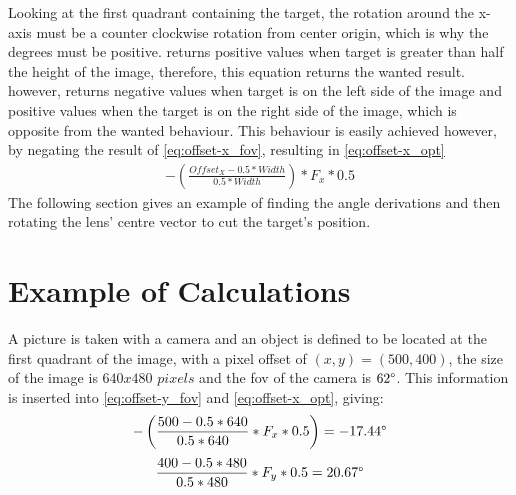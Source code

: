 Looking at the first quadrant containing the target, the rotation around the x-axis must be a counter clockwise rotation from center origin, which is why the degrees must be positive.  returns positive values when target is greater than half the height of the image, therefore, this equation returns the wanted result.  however, returns negative values when target is on the left side of the image and positive values when the target is on the right side of the image, which is opposite from the wanted behaviour. This behaviour is easily achieved however, by negating the result of \cref{eq:offset-x_fov}, resulting in \cref{eq:offset-x_opt}
\begin{align}
-\left(\frac{Offset_X - 0.5 * Width}{0.5 * Width}\right)*F_x*0.5
\label{eq:offset-x_opt}
\end{align}
The following section gives an example of finding the angle derivations and then rotating the lens' centre vector to cut the target's position.

\section{Example of Calculations}
A picture is taken with a camera and an object is defined to be located at the first quadrant of the image, with a pixel offset of $(x,y)=(500,400)$, the size of the image is $640x480$ $pixels$ and the \gls{fov} of the camera is $62\degree$. This information is inserted into \cref{eq:offset-y_fov} and \cref{eq:offset-x_opt}, giving:
\begin{align}
-\left(\frac{500 - 0.5 * 640}{0.5 * 640}*F_x*0.5\right) = -17.44\degree
\label{eq:ex_offset-x_opt}
\end{align}
\begin{align}
\frac{400 - 0.5 * 480}{0.5 * 480}*F_y*0.5 = 20.67\degree
\label{eq:ex_offset-y}
\end{align}

